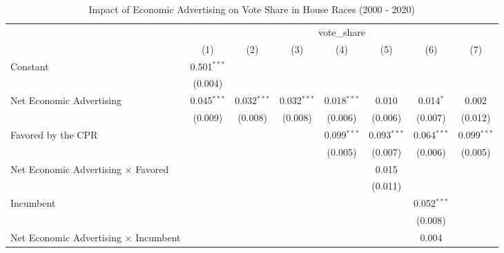 
\begin{table}[htbp]
   \caption{Impact of Economic Advertising on Vote Share in House Races (2000 - 2020)}
   \bigskip
   \centering
   \begin{tabular}{lccccccc}
      \toprule
       & \multicolumn{7}{c}{vote\_share}\\
                                                    & (1)           & (2)           & (3)           & (4)           & (5)           & (6)           & (7)\\  
      \midrule 
      Constant                                      & 0.501$^{***}$ &               &               &               &               &               &   \\   
                                                    & (0.004)       &               &               &               &               &               &   \\   
      Net Economic Advertising                      & 0.045$^{***}$ & 0.032$^{***}$ & 0.032$^{***}$ & 0.018$^{***}$ & 0.010         & 0.014$^{*}$   & 0.002\\   
                                                    & (0.009)       & (0.008)       & (0.008)       & (0.006)       & (0.006)       & (0.007)       & (0.012)\\   
      Favored by the CPR                            &               &               &               & 0.099$^{***}$ & 0.093$^{***}$ & 0.064$^{***}$ & 0.099$^{***}$\\   
                                                    &               &               &               & (0.005)       & (0.007)       & (0.006)       & (0.005)\\   
      Net Economic Advertising × Favored            &               &               &               &               & 0.015         &               &   \\   
                                                    &               &               &               &               & (0.011)       &               &   \\   
      Incumbent                                     &               &               &               &               &               & 0.052$^{***}$ &   \\   
                                                    &               &               &               &               &               & (0.008)       &   \\   
      Net Economic Advertising × Incumbent          &               &               &               &               &               & 0.004         &   \\   

\end{tabular}
\end{table}
